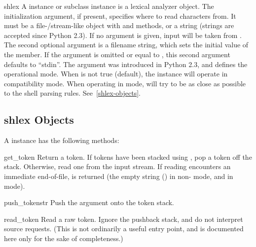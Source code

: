 \begin{classdesc}{shlex}{}
A  instance or subclass instance is a lexical analyzer
object.  The initialization argument, if present, specifies where to
read characters from. It must be a file-/stream-like object with
 and  methods, or a string (strings
are accepted since Python 2.3). If no argument is given, input will be
taken from .  The second optional argument is a filename
string, which sets the initial value of the  member.  If
the  argument is omitted or equal to ,
this second argument defaults to ``stdin''.  The  argument
was introduced in Python 2.3, and defines the operational mode.  When
 is not true (default), the  instance will
operate in compatibility mode.  When operating in \POSIX{} mode,
 will try to be as close as possible to the \POSIX{} shell
parsing rules.  See~\ref{shlex-objects}.
\end{classdesc}

\subsection{shlex Objects \label{shlex-objects}}

A  instance has the following methods:

\begin{methoddesc}{get_token}{}
Return a token.  If tokens have been stacked using
, pop a token off the stack.  Otherwise, read one
from the input stream.  If reading encounters an immediate
end-of-file,  is returned (the empty string ()
in non-\POSIX{} mode, and  in \POSIX{} mode).
\end{methoddesc}

\begin{methoddesc}{push_token}{str}
Push the argument onto the token stack.
\end{methoddesc}

\begin{methoddesc}{read_token}{}
Read a raw token.  Ignore the pushback stack, and do not interpret source
requests.  (This is not ordinarily a useful entry point, and is
documented here only for the sake of completeness.)
\end{methoddesc}

